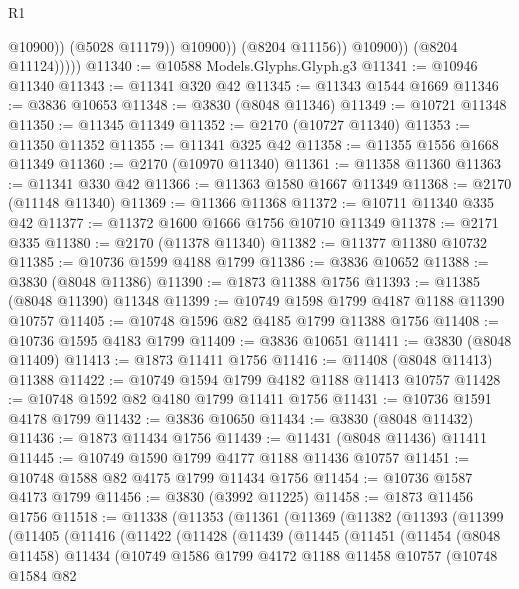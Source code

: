 \begin{lexlean}{R1}
\begin{coremodule}
                            @10900))
                        (@5028 @11179))
                      @10900))
                  (@8204 @11156))
                @10900))
            (@8204 @11124)))))
@11340 := @10588 Models.Glyphs.Glyph.g3
@11341 := @10946 @11340
@11343 := @11341 @320 @42
@11345 := @11343 @1544 @1669
@11346 := @3836 @10653
@11348 := @3830 (@8048 @11346)
@11349 := @10721 @11348
@11350 := @11345 @11349
@11352 := @2170 (@10727 @11340)
@11353 := @11350 @11352
@11355 := @11341 @325 @42
@11358 := @11355 @1556 @1668 @11349
@11360 := @2170 (@10970 @11340)
@11361 := @11358 @11360
@11363 := @11341 @330 @42
@11366 := @11363 @1580 @1667 @11349
@11368 := @2170 (@11148 @11340)
@11369 := @11366 @11368
@11372 := @10711 @11340 @335 @42
@11377 := @11372 @1600 @1666 @1756 @10710 @11349
@11378 := @2171 @335
@11380 := @2170 (@11378 @11340)
@11382 := @11377 @11380 @10732
@11385 := @10736 @1599 @4188 @1799
@11386 := @3836 @10652
@11388 := @3830 (@8048 @11386)
@11390 := @1873 @11388 @1756
@11393 := @11385 (@8048 @11390) @11348
@11399 := @10749 @1598 @1799 @4187 @1188 @11390 @10757
@11405 := @10748 @1596 @82 @4185 @1799 @11388 @1756
@11408 := @10736 @1595 @4183 @1799
@11409 := @3836 @10651
@11411 := @3830 (@8048 @11409)
@11413 := @1873 @11411 @1756
@11416 := @11408 (@8048 @11413) @11388
@11422 := @10749 @1594 @1799 @4182 @1188 @11413 @10757
@11428 := @10748 @1592 @82 @4180 @1799 @11411 @1756
@11431 := @10736 @1591 @4178 @1799
@11432 := @3836 @10650
@11434 := @3830 (@8048 @11432)
@11436 := @1873 @11434 @1756
@11439 := @11431 (@8048 @11436) @11411
@11445 := @10749 @1590 @1799 @4177 @1188 @11436 @10757
@11451 := @10748 @1588 @82 @4175 @1799 @11434 @1756
@11454 := @10736 @1587 @4173 @1799
@11456 := @3830 (@3992 @11225)
@11458 := @1873 @11456 @1756
@11518 := @11338
    (@11353
      (@11361
        (@11369
          (@11382
            (@11393
              (@11399
                (@11405
                  (@11416
                    (@11422
                      (@11428
                        (@11439
                          (@11445
                            (@11451
                              (@11454
                                (@8048 @11458)
                                @11434
                                (@10749
                                  @1586
                                  @1799
                                  @4172
                                  @1188
                                  @11458
                                  @10757
                                  (@10748
                                    @1584
                                    @82

\end{coremodule}
\end{lexlean}
